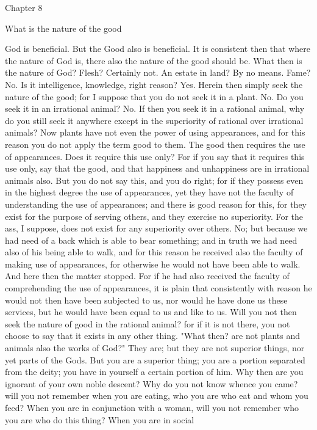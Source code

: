 \documentclass[a4paper]{article}
\begin{document}
Chapter 8

What is the nature of the good

    God is beneficial. But the Good also is beneficial. It is consistent then
that where the nature of God is, there also the nature of the good should be.
What then is the nature of God? Flesh? Certainly not. An estate in land? By no
means. Fame? No. Is it intelligence, knowledge, right reason? Yes. Herein then
simply seek the nature of the good; for I suppose that you do not seek it in a
plant. No. Do you seek it in an irrational animal? No. If then you seek it in a
rational animal, why do you still seek it anywhere except in the superiority of
rational over irrational animals? Now plants have not even the power of using
appearances, and for this reason you do not apply the term good to them. The
good then requires the use of appearances. Does it require this use only? For
if you say that it requires this use only, say that the good, and that
happiness and unhappiness are in irrational animals also. But you do not say
this, and you do right; for if they possess even in the highest degree the use
of appearances, yet they have not the faculty of understanding the use of
appearances; and there is good reason for this, for they exist for the purpose
of serving others, and they exercise no superiority. For the ass, I suppose,
does not exist for any superiority over others. No; but because we had need of
a back which is able to bear something; and in truth we had need also of his
being able to walk, and for this reason he received also the faculty of making
use of appearances, for otherwise he would not have been able to walk. And here
then the matter stopped. For if he had also received the faculty of
comprehending the use of appearances, it is plain that consistently with reason
he would not then have been subjected to us, nor would he have done us these
services, but he would have been equal to us and like to us.
    Will you not then seek the nature of good in the rational animal? for if it
is not there, you not choose to say that it exists in any other thing. "What
then? are not plants and animals also the works of God?" They are; but they are
not superior things, nor yet parts of the Gods. But you are a superior thing;
you are a portion separated from the deity; you have in yourself a certain
portion of him. Why then are you ignorant of your own noble descent? Why do you
not know whence you came? will you not remember when you are eating, who you
are who eat and whom you feed? When you are in conjunction with a woman, will
you not remember who you are who do this thing? When you are in social
\end{document}
